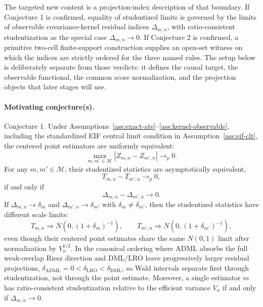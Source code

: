 \documentclass[11pt]{article}
\theoremstyle{definition}
\theoremstyle{plain}
\theoremstyle{remark}
\begin{document}
The targeted new content is a projection-index description of that boundary.
If Conjecture 1 is confirmed, equality of studentized limits is governed by
the limits of observable covariance-kernel residual indices
\(\Delta_{m,n}\), with ratio-consistent studentization as the special case
\(\Delta_{m,n}\to0\).  If Conjecture 2 is confirmed, a primitive two-cell
finite-support construction supplies an open-set witness on which the indices
are strictly ordered for the three named rules.  The setup below is deliberately
separate from those verdicts: it defines the causal target, the observable
functional, the common score normalization, and the projection objects that
later stages will use.

\paragraph{Motivating conjecture(s).}
Conjecture 1.
Under Assumptions~\ref{ass:exact-ate}--\ref{ass:kernel-observable}, including the standardized EIF central limit condition in Assumption~\ref{ass:eif-clt}, the centered point estimators are uniformly equivalent:
\[
  \max_{m,m'\in\mathcal M}|Z_{m,n}-Z_{m',n}|\to_p0.
\]
For any \(m,m'\in\mathcal M\), their studentized statistics are asymptotically equivalent,
\[
  T_{m,n}-T_{m',n}\to_p0,
\]
if and only if
\[
  \Delta_{m,n}-\Delta_{m',n}\to0.
\]
If \(\Delta_{m,n}\to\delta_m\) and \(\Delta_{m',n}\to\delta_{m'}\) with \(\delta_m\ne\delta_{m'}\), then the studentized statistics have different scale limits:
\[
  T_{m,n}\Rightarrow N(0,(1+\delta_m)^{-1}),\qquad
  T_{m',n}\Rightarrow N(0,(1+\delta_{m'})^{-1}),
\]
even though their centered point estimates share the same \(N(0,1)\) limit after normalization by \(V_n^{1/2}\).  In the canonical ordering where ADML absorbs the full weak-overlap Riesz direction and DML/LRO leave progressively larger residual projections, \(\delta_{\mathrm{ADML}}=0<\delta_{\mathrm{LRO}}<\delta_{\mathrm{DML}}\), so Wald intervals separate first through studentization, not through the point estimate.  Moreover, a single estimator \(m\) has ratio-consistent studentization relative to the efficient variance \(V_n\) if and only if \(\Delta_{m,n}\to0\).
\end{document}

